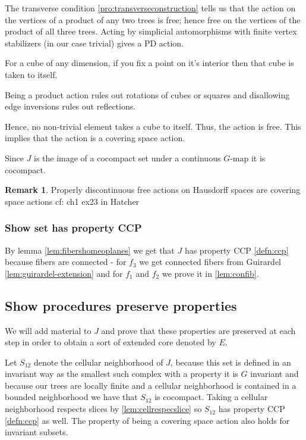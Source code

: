 \documentclass[12pt,parskip=full]{report}
\theoremstyle{plain}
\theoremstyle{definition}
\newtheorem{rmk}[thm]{Remark}
\begin{document}
    
        
        The transverse condition \ref{pro:transverseconstruction} tells us that the action on the vertices of a product of any two trees is free; hence free on the vertices of the product of all three trees. Acting by simplicial automorphisms with finite vertex stabilizers (in our case trivial) gives a PD action. 
        
        For a cube of any dimension, if you fix a point on it's interior then that cube is taken to itself.
        
        Being a product action rules out rotations of cubes or squares and disallowing edge inversions rules out reflections.
        
        Hence, no non-trivial element takes a cube to itself. Thus, the action is free. This implies that the action is a covering space action.
        
        Since \(J\) is the image of a cocompact set under a continuous \(G\)-map it is cocompact.
        
        \begin{rmk}
            Properly discontinuous free actions on Hausdorff spaces are covering space actions cf: ch1 ex23 in Hatcher
        \end{rmk}

\subsubsection{Show set has property CCP}
        
        By lemma \ref{lem:fibershomeoplanes} we get that \(J\) has property CCP \ref{defn:ccp} because fibers are connected - for $f_3$ we get connected fibers from Guirardel \ref{lem:guirardel-extension} and for $f_1$ and $f_2$ we prove it in \ref{lem:confib}.

\subsection{Show procedures preserve properties}

We will add material to $J$ and prove that these properties are preserved at each step in order to obtain a sort of extended core denoted by $E$.

Let \(S_{12}\) denote the cellular neighborhood of \(J\), because this set is defined in an invariant way as the smallest such complex with a property it is \(G\) invariant and because our trees are locally finite and a cellular neighborhood is contained in a bounded neighborhood we have that \(S_{12}\) is cocompact. Taking a cellular neighborhood respects slices by \ref{lem:cellrespecslice}  so \(S_{12}\) has property CCP \ref{defn:ccp} as well. The property of being a covering space action also holds for invariant subsets.
        
\end{document}
